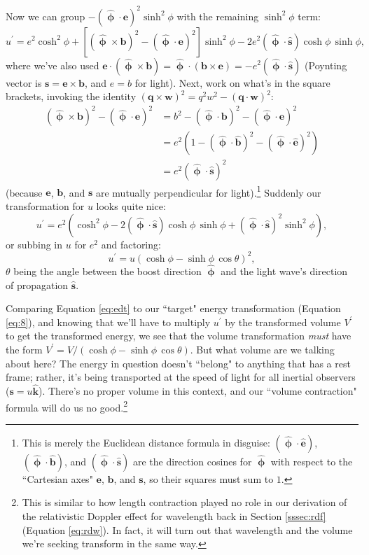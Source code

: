 \documentclass[12pt]{article}
\renewcommand{\vv}[1]{\mathbf{#1}}
\newcommand{\hatphi}{\bm{\hat{\upphi}}}
\begin{document}
Now we can group $- (\hatphi \cdot \vv e)^2 \sinh^2{\phi}$ with the remaining $\sinh^2{\phi}$ term:
\begin{equation*}
u^\prime = e^2 \cosh^2{\phi} + \left[ (\hatphi \times \vv b)^2 - (\hatphi \cdot \vv e)^2 \right] \sinh^2{\phi} - 2 e^2 ( \hatphi \cdot \vv{\hat s}) \cosh{\phi} \, \sinh{\phi} ,
\end{equation*}
where we've also used $\vv e \cdot (\hatphi \times \vv b) = \hatphi \cdot (\vv b \times \vv e) = - e^2 (\hatphi \cdot \vv{\hat s})$ (Poynting vector is $\vv s = \vv e \times \vv b$, and $e = b$ for light). Next, work on what's in the square brackets, invoking the identity $(\vv q \times \vv w)^2 = q^2 w^2 - (\vv q \cdot \vv w)^2$:
\begin{equation*}
\begin{aligned}
(\hatphi \times \vv b)^2 - (\hatphi \cdot \vv e)^2 &= b^2 - (\hatphi \cdot \vv b)^2 - (\hatphi \cdot \vv e)^2 \\
&= e^2 \left( 1 - (\hatphi \cdot \vv{\hat b})^2 - (\hatphi \cdot \vv{\hat e})^2 \right) \\
&= e^2 ( \hatphi \cdot \vv{\hat s} )^2
\end{aligned}
\end{equation*}
(because $\vv e$, $\vv b$, and $\vv s$ are mutually perpendicular for light).\footnote{This is merely the Euclidean distance formula in disguise: $(\hatphi \cdot \vv{\hat e})$, $(\hatphi \cdot \vv{\hat b})$, and $( \hatphi \cdot \vv{\hat s} )$ are the direction cosines for $\hatphi$ with respect to the ``Cartesian axes" $\vv e$, $\vv b$, and $\vv s$, so their squares must sum to $1$.} Suddenly our transformation for $u$ looks quite nice:
\begin{equation*}
u^\prime = e^2 \left( \cosh^2{\phi} - 2 ( \hatphi \cdot \vv{\hat s}) \cosh{\phi} \, \sinh{\phi} + ( \hatphi \cdot \vv{\hat s} )^2 \sinh^2{\phi} \right) ,
\end{equation*}
or subbing in $u$ for $e^2$ and factoring:
\begin{equation}\label{eq:edt}
u^\prime = u \left( \cosh{\phi} - \sinh{\phi} \, \cos{\theta} \right)^2 ,
\end{equation}
$\theta$ being the angle between the boost direction $\hatphi$ and the light wave's direction of propagation $\vv{\hat s}$.

Comparing Equation \ref{eq:edt} to our ``target" energy transformation (Equation \ref{eq:8}), and knowing that we'll have to multiply $u^\prime$ by the transformed volume $V^\prime$ to get the transformed energy, we see that the volume transformation \emph{must} have the form $V^\prime = V / ( \cosh{\phi} - \sinh{\phi} \, \cos{\theta} )$. But what volume are we talking about here? The energy in question doesn't ``belong" to anything that has a rest frame; rather, it's being transported at the speed of light for all inertial observers ($\vv s = u \vv{\hat{k}}$). There's no proper volume in this context, and our ``volume contraction" formula will do us no good.\footnote{This is similar to how length contraction played no role in our derivation of the relativistic Doppler effect for wavelength back in Section \ref{sssec:rdf} (Equation \ref{eq:rdw}). In fact, it will turn out that wavelength and the volume we're seeking transform in the same way.}
\end{document}
